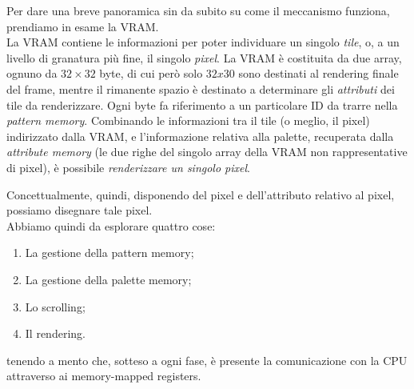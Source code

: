 \documentclass[11pt]{article}
\begin{document}
Per dare una breve panoramica sin da subito su come il meccanismo funziona, prendiamo in esame la VRAM.\\
La VRAM contiene le informazioni per poter individuare un singolo \emph{tile}, o, a un livello di granatura più fine, il singolo \emph{pixel}. La VRAM è costituita da due array, ognuno da $32\times32$ byte, di cui però solo $32x30$ sono destinati al rendering finale del frame, mentre il rimanente spazio è destinato a determinare gli \emph{attributi} dei tile da renderizzare. Ogni byte fa riferimento a un particolare ID da trarre nella \emph{pattern memory}. Combinando le informazioni tra il tile (o meglio, il pixel) indirizzato dalla VRAM, e l'informazione relativa alla palette, recuperata dalla \emph{attribute memory} (le due righe del singolo array della VRAM non rappresentative di pixel), è possibile \emph{renderizzare un singolo pixel}.

Concettualmente, quindi, disponendo del pixel e dell'attributo relativo al pixel, possiamo disegnare tale pixel.\\
Abbiamo quindi da esplorare quattro cose:
\begin{enumerate}
	\item{
		La gestione della pattern memory;
	}
	\item{
		La gestione della palette memory;
	}
	\item{
		Lo scrolling;
	}
	\item{
		Il rendering.
	}
\end{enumerate}
tenendo a mento che, sotteso a ogni fase, è presente la comunicazione con la CPU attraverso ai memory-mapped registers.
\end{document}
